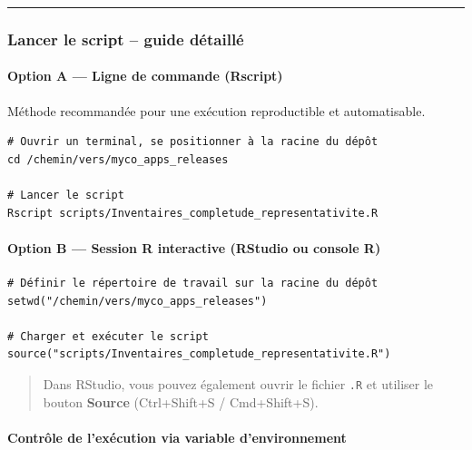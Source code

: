 \begin{center}\rule{0.5\linewidth}{0.5pt}\end{center}

\subsubsection{Lancer le script -- guide
détaillé}\label{lancer-le-script-guide-duxe9tailluxe9}

\paragraph{Option A --- Ligne de commande
(Rscript)}\label{option-a-ligne-de-commande-rscript}

Méthode recommandée pour une exécution reproductible et automatisable.

\begin{verbatim}
# Ouvrir un terminal, se positionner à la racine du dépôt
cd /chemin/vers/myco_apps_releases

# Lancer le script
Rscript scripts/Inventaires_completude_representativite.R
\end{verbatim}

\paragraph{Option B --- Session R interactive (RStudio ou console
R)}\label{option-b-session-r-interactive-rstudio-ou-console-r}

\begin{verbatim}
# Définir le répertoire de travail sur la racine du dépôt
setwd("/chemin/vers/myco_apps_releases")

# Charger et exécuter le script
source("scripts/Inventaires_completude_representativite.R")
\end{verbatim}

\begin{quote}
Dans RStudio, vous pouvez également ouvrir le fichier \texttt{.R} et
utiliser le bouton \textbf{Source} (Ctrl+Shift+S / Cmd+Shift+S).
\end{quote}

\paragraph{Contrôle de l'exécution via variable
d'environnement}\label{contruxf4le-de-lexuxe9cution-via-variable-denvironnement}

